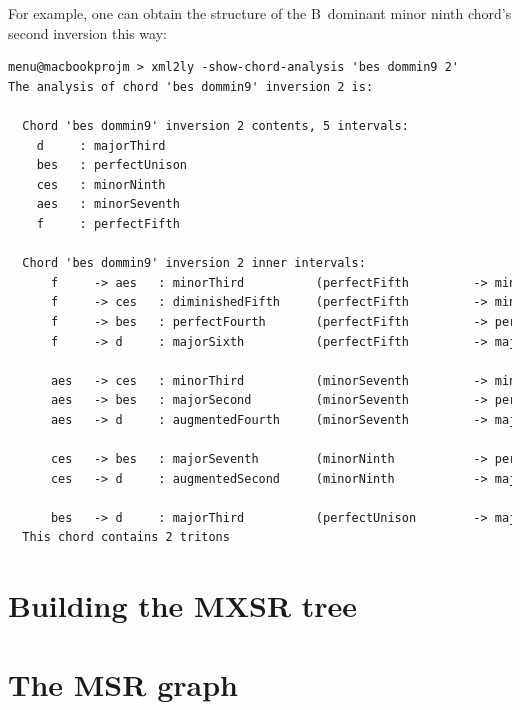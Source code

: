 \documentclass[12pt,a4paper]{article}
\begin{document}
For example, one can obtain the structure of the B\Flat\ dominant minor ninth chord's second inversion this way:
\begin{lstlisting}[language=XML]
menu@macbookprojm > xml2ly -show-chord-analysis 'bes dommin9 2'
The analysis of chord 'bes dommin9' inversion 2 is:

  Chord 'bes dommin9' inversion 2 contents, 5 intervals:
    d     : majorThird
    bes   : perfectUnison
    ces   : minorNinth
    aes   : minorSeventh
    f     : perfectFifth

  Chord 'bes dommin9' inversion 2 inner intervals:
      f     -> aes   : minorThird          (perfectFifth         -> minorSeventh)
      f     -> ces   : diminishedFifth     (perfectFifth         -> minorNinth)
      f     -> bes   : perfectFourth       (perfectFifth         -> perfectUnison)
      f     -> d     : majorSixth          (perfectFifth         -> majorThird)

      aes   -> ces   : minorThird          (minorSeventh         -> minorNinth)
      aes   -> bes   : majorSecond         (minorSeventh         -> perfectUnison)
      aes   -> d     : augmentedFourth     (minorSeventh         -> majorThird)

      ces   -> bes   : majorSeventh        (minorNinth           -> perfectUnison)
      ces   -> d     : augmentedSecond     (minorNinth           -> majorThird)

      bes   -> d     : majorThird          (perfectUnison        -> majorThird)
  This chord contains 2 tritons
\end{lstlisting}


\section{Building the MXSR tree}


\section{The MSR graph}
\end{document}
